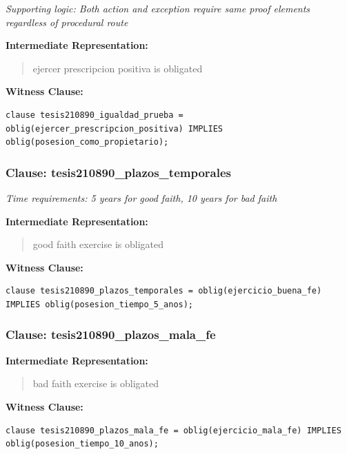 \documentclass[11pt,a4paper]{article}
\begin{document}
\textit{Supporting logic: Both action and exception require same proof elements regardless of procedural route}

\textbf{Intermediate Representation:}

\begin{quote}
ejercer prescripcion positiva is obligated
\end{quote}

\textbf{Witness Clause:}

\begin{lstlisting}[style=witnessstyle, language=Witness]
clause tesis210890_igualdad_prueba = oblig(ejercer_prescripcion_positiva) IMPLIES oblig(posesion_como_propietario);
\end{lstlisting}

\subsubsection{Clause: tesis210890\_plazos\_temporales}

\textit{Time requirements: 5 years for good faith, 10 years for bad faith}

\textbf{Intermediate Representation:}

\begin{quote}
good faith exercise is obligated
\end{quote}

\textbf{Witness Clause:}

\begin{lstlisting}[style=witnessstyle, language=Witness]
clause tesis210890_plazos_temporales = oblig(ejercicio_buena_fe) IMPLIES oblig(posesion_tiempo_5_anos);
\end{lstlisting}

\subsubsection{Clause: tesis210890\_plazos\_mala\_fe}

\textbf{Intermediate Representation:}

\begin{quote}
bad faith exercise is obligated
\end{quote}

\textbf{Witness Clause:}

\begin{lstlisting}[style=witnessstyle, language=Witness]
clause tesis210890_plazos_mala_fe = oblig(ejercicio_mala_fe) IMPLIES oblig(posesion_tiempo_10_anos);
\end{lstlisting}
\end{document}
